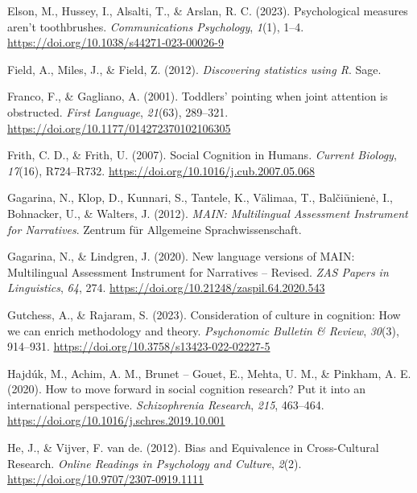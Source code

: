 \documentclass[
  man,floatsintext]{apa7}
\newlength{\cslhangindent}
\newenvironment{CSLReferences}[2] %
 {\begin{list}{}{%
  \setlength{\itemindent}{0pt}
  \setlength{\leftmargin}{0pt}
  \setlength{\parsep}{0pt}
  \ifodd #1
   \setlength{\leftmargin}{\cslhangindent}
   \setlength{\itemindent}{-1\cslhangindent}
  \fi
  \setlength{\itemsep}{#2\baselineskip}}}
 {\end{list}}
\begin{document}
\begin{CSLReferences}{1}{0}
Elson, M., Hussey, I., Alsalti, T., \& Arslan, R. C. (2023). Psychological measures aren't toothbrushes. \emph{Communications Psychology}, \emph{1}(1), 1--4. \url{https://doi.org/10.1038/s44271-023-00026-9}

Field, A., Miles, J., \& Field, Z. (2012). \emph{Discovering statistics using {R}}. Sage.

Franco, F., \& Gagliano, A. (2001). Toddlers' pointing when joint attention is obstructed. \emph{First Language}, \emph{21}(63), 289--321. \url{https://doi.org/10.1177/014272370102106305}

Frith, C. D., \& Frith, U. (2007). Social {Cognition} in {Humans}. \emph{Current Biology}, \emph{17}(16), R724--R732. \url{https://doi.org/10.1016/j.cub.2007.05.068}

Gagarina, N., Klop, D., Kunnari, S., Tantele, K., Välimaa, T., Balčiūnienė, I., Bohnacker, U., \& Walters, J. (2012). \emph{{MAIN}: {Multilingual Assessment Instrument} for {Narratives}}. Zentrum f{ü}r Allgemeine Sprachwissenschaft.

Gagarina, N., \& Lindgren, J. (2020). New language versions of {MAIN}: {Multilingual Assessment Instrument} for {Narratives} -- {Revised}. \emph{ZAS Papers in Linguistics}, \emph{64}, 274. \url{https://doi.org/10.21248/zaspil.64.2020.543}

Gutchess, A., \& Rajaram, S. (2023). Consideration of culture in cognition: {How} we can enrich methodology and theory. \emph{Psychonomic Bulletin \& Review}, \emph{30}(3), 914--931. \url{https://doi.org/10.3758/s13423-022-02227-5}

Hajdúk, M., Achim, A. M., Brunet -- Gouet, E., Mehta, U. M., \& Pinkham, A. E. (2020). How to move forward in social cognition research? {Put} it into an international perspective. \emph{Schizophrenia Research}, \emph{215}, 463--464. \url{https://doi.org/10.1016/j.schres.2019.10.001}

He, J., \& Vijver, F. van de. (2012). Bias and {Equivalence} in {Cross-Cultural Research}. \emph{Online Readings in Psychology and Culture}, \emph{2}(2). \url{https://doi.org/10.9707/2307-0919.1111}


\end{CSLReferences}
\end{document}

